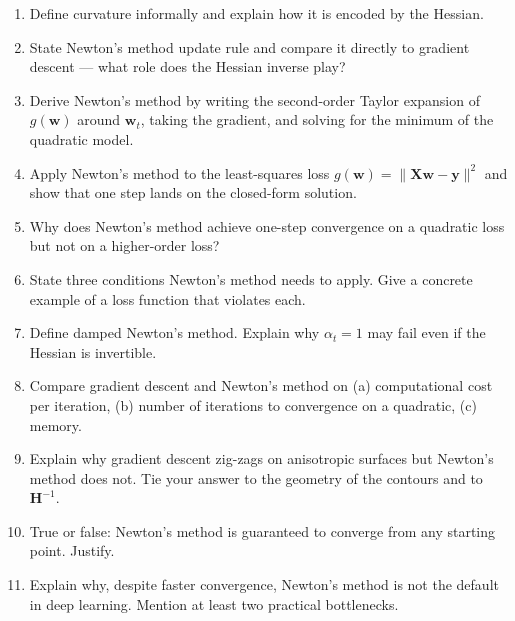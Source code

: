 \documentclass[11pt, a4paper]{article}
\begin{document}
\begin{enumerate}
  \item Define curvature informally and explain how it is encoded by the Hessian.
  \item State Newton's method update rule and compare it directly to gradient descent — what role does the Hessian inverse play?
  \item Derive Newton's method by writing the second-order Taylor expansion of $g(\mathbf{w})$ around $\mathbf{w}_t$, taking the gradient, and solving for the minimum of the quadratic model.
  \item Apply Newton's method to the least-squares loss $g(\mathbf{w}) = \|\mathbf{X}\mathbf{w}-\mathbf{y}\|^2$ and show that one step lands on the closed-form solution.
  \item Why does Newton's method achieve one-step convergence on a quadratic loss but not on a higher-order loss?
  \item State three conditions Newton's method needs to apply. Give a concrete example of a loss function that violates each.
  \item Define damped Newton's method. Explain why $\alpha_t = 1$ may fail even if the Hessian is invertible.
  \item Compare gradient descent and Newton's method on (a) computational cost per iteration, (b) number of iterations to convergence on a quadratic, (c) memory.
  \item Explain why gradient descent zig-zags on anisotropic surfaces but Newton's method does not. Tie your answer to the geometry of the contours and to $\mathbf{H}^{-1}$.
  \item True or false: Newton's method is guaranteed to converge from any starting point. Justify.
  \item Explain why, despite faster convergence, Newton's method is not the default in deep learning. Mention at least two practical bottlenecks.
\end{enumerate}
\end{document}
